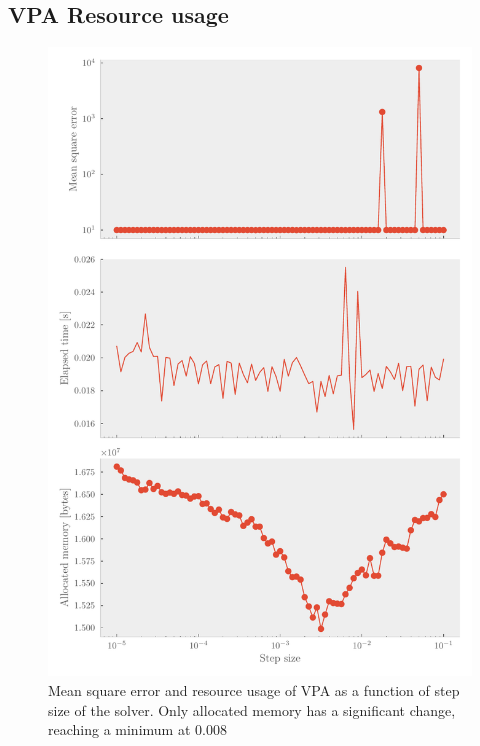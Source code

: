 \begin{appendices}
  \section{VPA Resource usage}
\begin{figure}[p]
  \centering
  \includegraphics[]{Figures/vpa_measurements.pdf}
  \caption{\label{fig:vpa_measurements} Mean square error and resource usage of
    VPA as a function of step size of the solver. Only allocated memory has a
    significant change, reaching a minimum at \(0.008\)}
\end{figure}


\end{appendices}

